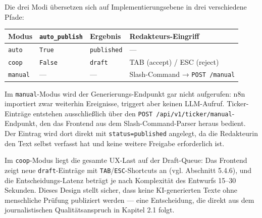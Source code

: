 Die drei Modi übersetzen sich auf Implementierungsebene in drei
verschiedene Pfade:

{\def\LTcaptype{none} %
\begin{longtable}[]{@{}
  >{\raggedright\arraybackslash}p{}
  >{\raggedright\arraybackslash}p{}
  >{\raggedright\arraybackslash}p{}
  >{\raggedright\arraybackslash}p{}@{}}
\toprule\noalign{}
\begin{minipage}[b]{\linewidth}\raggedright
Modus
\end{minipage} & \begin{minipage}[b]{\linewidth}\raggedright
\texttt{auto\_publish}
\end{minipage} & \begin{minipage}[b]{\linewidth}\raggedright
Ergebnis
\end{minipage} & \begin{minipage}[b]{\linewidth}\raggedright
Redakteurs-Eingriff
\end{minipage} \\
\midrule\noalign{}
\endhead
\bottomrule\noalign{}
\endlastfoot
\texttt{auto} & \texttt{True} & \texttt{published} & --- \\
\texttt{coop} & \texttt{False} & \texttt{draft} & TAB (accept) / ESC
(reject) \\
\texttt{manual} & --- & --- & Slash-Command → \texttt{POST\ /manual} \\
\end{longtable}
}

Im \texttt{manual}-Modus wird der Generierungs-Endpunkt gar nicht
aufgerufen: n8n importiert zwar weiterhin Ereignisse, triggert aber
keinen LLM-Aufruf. Ticker-Einträge entstehen ausschließlich über den
\texttt{POST\ /api/v1/ticker/manual}-Endpunkt, den das Frontend aus dem
Slash-Command-Parser heraus bedient. Der Eintrag wird dort direkt mit
\texttt{status=published} angelegt, da die Redakteurin den Text selbst
verfasst hat und keine weitere Freigabe erforderlich ist.

Im \texttt{coop}-Modus liegt die gesamte UX-Last auf der Draft-Queue:
Das Frontend zeigt neue \texttt{draft}-Einträge mit
\texttt{TAB}/\texttt{ESC}-Shortcuts an (vgl. Abschnitt 5.4.6), und die
Entscheidungs-Latenz beträgt je nach Komplexität des Entwurfs 15--30
Sekunden. Dieses Design stellt sicher, dass keine KI-generierten Texte
ohne menschliche Prüfung publiziert werden --- eine Entscheidung, die
direkt aus dem journalistischen Qualitätsanspruch in Kapitel 2.1 folgt.

